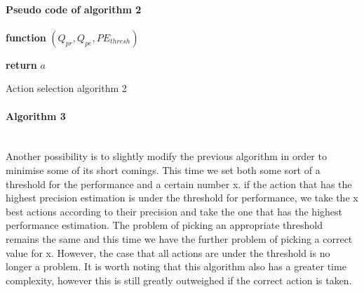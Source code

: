 \paragraph{Pseudo code of algorithm 2}
\begin{center}
	\begin{algorithm}[H]

    \textbf{function}  $(Q_{pr},Q_{pe},PE_{thresh})$\;
    
    
    \Indp{}\Indm
    \Indp{} \Indm
    \Indp
    
   
  
   \textbf{return} $a$
   
    
\caption{Action selection algorithm 2}
\end{algorithm}
\end{center}
\paragraph{Algorithm 3}\mbox{}\\
Another possibility is to slightly modify the previous algorithm in order to minimise some of its short comings. This time we set both some sort of a threshold for the performance and a certain number x. if the action that has the highest precision estimation is under the threshold for performance, we take the x best actions according to their precision and take the one that has the highest performance estimation. The problem of picking an appropriate threshold remains the same and this time we have the further problem of picking a correct value for x. However, the case that all actions are under the threshold is no longer a problem. It is worth noting that this algorithm also has a greater time complexity, however this is still greatly outweighed if the correct action is taken.
